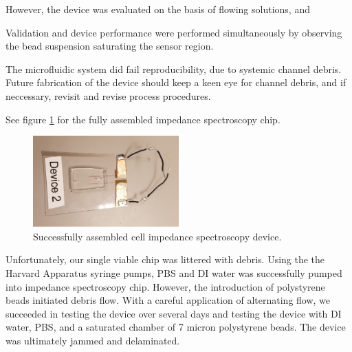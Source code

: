\par However, the device was evaluated on the basis of flowing solutions, and 

\par Validation and device performance were performed simultaneously by observing the bead suspension saturating the sensor region. 

\par The microfluidic system did fail reproducibility, due to systemic channel debris. Future fabrication of the device should keep a keen eye for channel debris, and if neccessary, revisit and revise process procedures. 

\par See figure \ref{fig:assembled_good_device} for the fully assembled impedance spectroscopy chip.

\begin{figure}[h]
    \centering
    \includegraphics[width=0.5\textwidth]{images/device_22.jpg}
    \caption{Successfully assembled cell impedance spectroscopy device.}
    \label{fig:assembled_good_device}
\end{figure}

\par Unfortunately, our single viable chip was littered with debris. Using the the Harvard Apparatus syringe pumps, PBS and DI water was successfully pumped into impedance spectroscopy chip. However, the introduction of polystyrene beads initiated debris flow. With a careful application of alternating flow, we succeeded in testing the device over several days and testing the device with DI water, PBS, and a saturated chamber of 7 micron polystyrene beads. The device was ultimately jammed and delaminated.

